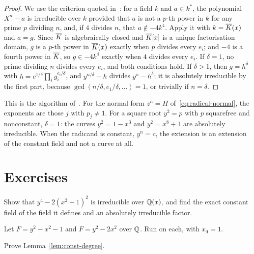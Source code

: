 \begin{proof}
We use the criterion quoted in~\cite[Theorem~3.6]{trager1984}: for a field
$k$ and $a \in k^*$, the polynomial $X^n - a$ is irreducible over $k$ provided
that $a$ is not a $p$-th power in $k$ for any prime $p$ dividing $n$, and, if
$4$ divides $n$, that $a \notin -4 k^4$. Apply it with $k = \overline{K}(x)$ and $a
= g$. Since $\overline{K}$ is algebraically closed and $\overline{K}[x]$ is a unique
factorisation domain, $g$ is a $p$-th power in $\overline{K}(x)$ exactly when $p$
divides every $e_i$; and $-4$ is a fourth power in $\overline{K}$, so $g \in -4
k^4$ exactly when $4$ divides every $e_i$. If $\delta = 1$, no prime dividing
$n$ divides every $e_i$, and both conditions hold. If $\delta > 1$, then $g =
h^\delta$ with $h = c^{1/\delta} \prod_i g_i^{e_i/\delta}$, and $y^{n/\delta}
- h$ divides $y^n - h^\delta$; it is absolutely irreducible by the first
part, because $\gcd(n/\delta, e_1/\delta, \dots) = 1$, or trivially if $n =
\delta$.
\end{proof}

This is the algorithm of~\cite[\S3.3]{trager1984}. For the normal form $z^n
= H$ of~\eqref{eq:radical-normal}, the exponents are those $j$ with $p_j \ne
1$. For a square root $y^2 = p$ with $p$ squarefree and nonconstant, $\delta
= 1$: the curves $y^2 = 1 - x^3$ and $y^2 = x^8 + 1$ are absolutely
irreducible. When the radicand is constant, $y^n = c$, the extension is an
extension of the constant field and not a curve at all.

\section*{Exercises}

\begin{exercise}
Show that $y^4 - 2 (x^2 + 1)^2$ is irreducible over $\mathbb{Q}(x)$, and find the
exact constant field of the field it defines and an absolutely irreducible
factor.
\end{exercise}

\begin{exercise}
Let $F = y^2 - x^2 - 1$ and $F = y^2 - 2x^2$ over $\mathbb{Q}$. Run
 on each, with $x_0 = 1$.
\end{exercise}

\begin{exercise}
Prove Lemma~\ref{lem:const-degree}.
\end{exercise}
